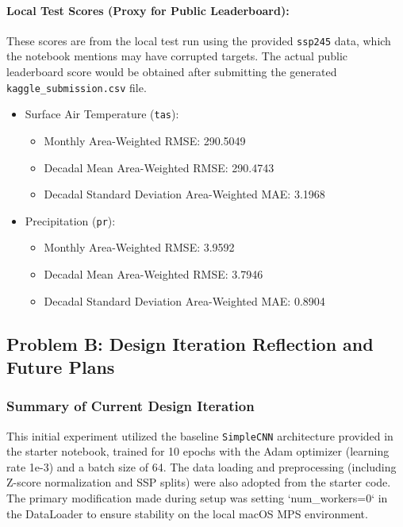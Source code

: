 \documentclass{article}
\begin{document}
\paragraph{Local Test Scores (Proxy for Public Leaderboard):}
These scores are from the local test run using the provided \texttt{ssp245} data, which the notebook mentions may have corrupted targets. The actual public leaderboard score would be obtained after submitting the generated \texttt{kaggle\_submission.csv} file.
\begin{itemize}
    \item Surface Air Temperature (\texttt{tas}):
    \begin{itemize}
        \item Monthly Area-Weighted RMSE: 290.5049
        \item Decadal Mean Area-Weighted RMSE: 290.4743
        \item Decadal Standard Deviation Area-Weighted MAE: 3.1968
    \end{itemize}
    \item Precipitation (\texttt{pr}):
    \begin{itemize}
        \item Monthly Area-Weighted RMSE: 3.9592
        \item Decadal Mean Area-Weighted RMSE: 3.7946
        \item Decadal Standard Deviation Area-Weighted MAE: 0.8904
    \end{itemize}
\end{itemize}

\subsection{Problem B: Design Iteration Reflection and Future Plans}

\subsubsection{Summary of Current Design Iteration}
This initial experiment utilized the baseline \texttt{SimpleCNN} architecture provided in the starter notebook, trained for 10 epochs with the Adam optimizer (learning rate 1e-3) and a batch size of 64. The data loading and preprocessing (including Z-score normalization and SSP splits) were also adopted from the starter code. The primary modification made during setup was setting `num_workers=0` in the DataLoader to ensure stability on the local macOS MPS environment.
\end{document}
